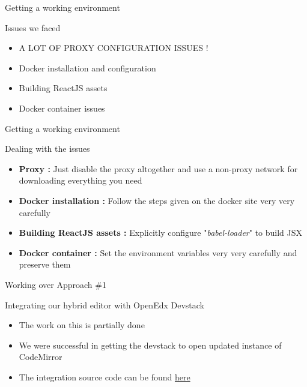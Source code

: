 \documentclass{beamer}
\begin{document}
	\begin{frame}{Getting a working environment}
		\begin{block}{Issues we faced}
			\begin{itemize}
				\item \alert{A LOT OF PROXY CONFIGURATION ISSUES !}
				\item Docker installation and configuration
				\item Building ReactJS assets
				\item Docker container issues
			\end{itemize}
		\end{block}
	\end{frame}
	
	\begin{frame}{Getting a working environment}
		\begin{block}{Dealing with the issues }
			\begin{itemize}
				\item \textbf{Proxy :} Just disable the proxy altogether and use a non-proxy network for downloading everything you need \pause
				\item \textbf{Docker installation : } Follow the steps given on the docker site very very carefully \pause
				\item \textbf{Building ReactJS assets : } Explicitly configure "\textit{babel-loader}" to build JSX \pause
				\item \textbf{Docker container : } Set the environment variables very very carefully and preserve them 
			\end{itemize}
		\end{block}
	\end{frame}
	
	\begin{frame}{Working over Approach \#1}
		\begin{block}{Integrating our hybrid editor with OpenEdx Devstack}
			\begin{itemize}
				\item The work on this is partially done
				\item We were successful in getting the devstack to open updated instance of CodeMirror
				\item The integration source code can be found \alert{\hyperlink{GitHub Link}{here}}
			\end{itemize}
		\end{block}
	\end{frame}
\end{document}
